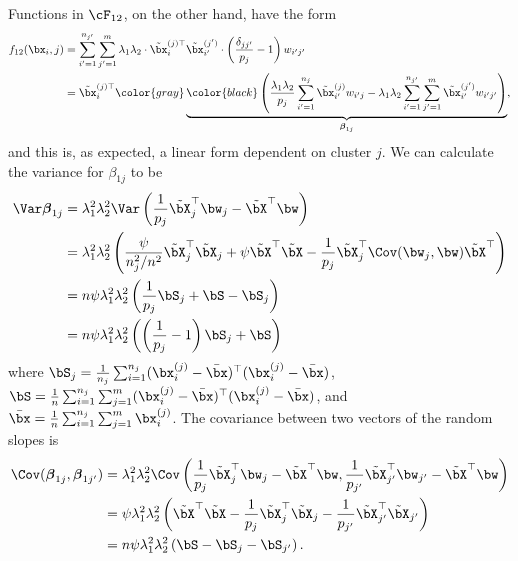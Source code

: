 Functions in $\cF_{12}$, on the other hand, have the form
\begin{align*}
  f_{12}(\bx_i, j)
  &= \sum_{i'=1}^{n_{j'}}\sum_{j'=1}^m \lambda_1\lambda_2 \cdot \tilde \bx_i^{(j)\top} \tilde \bx_{i'}^{(j')} \cdot \left( \frac{\delta_{jj'}}{p_j} - 1 \right)  w_{i'j'} \\
  &=  \tilde \bx_i^{(j)\top}   
  {\color{gray}
  \underbrace{\color{black}
  \left( \frac{\lambda_1\lambda_2}{p_j} \sum_{i'=1}^{n_{j}}  \tilde \bx_{i'}^{(j)} w_{i'j} - \lambda_1\lambda_2\sum_{i'=1}^{n_{j'}}\sum_{j'=1}^m  \tilde \bx_{i'}^{(j')}  w_{i'j'} \right)
  }_{\boldsymbol\beta_{1j}}},
\end{align*}
and this is, as expected, a linear form dependent on cluster $j$.
We can calculate the variance for $\beta_{1j}$ to be
\begin{align*}
  \Var \boldsymbol{\beta}_{1j}
  &= \lambda_1^2\lambda_2^2 \Var\left( \frac{1}{p_j} \tilde\bX_j^\top \bw_j - \tilde\bX^\top \bw \right) \\
  &= \lambda_1^2\lambda_2^2 \left( \frac{\psi}{n_j^2/n^2} \tilde\bX_j^\top\tilde\bX_j + \psi \tilde\bX^\top  \tilde\bX - \frac{1}{p_j} \tilde\bX_j^\top \Cov( \bw_j,\bw) \tilde\bX^\top  \right) \\
  &= n\psi\lambda_1^2\lambda_2^2 \left( \frac{1}{p_j}\bS_j +  \bS - \bS_{j} \right) \\
  &= n\psi\lambda_1^2\lambda_2^2 \left( \left(\frac{1}{p_j}-1\right)\bS_j +  \bS  \right)
\end{align*}
where $\bS_j = \frac{1}{n_j} \sum_{i=1}^{n_j} (\bx_i^{(j)} - \bar \bx)^\top(\bx_i^{(j)} - \bar \bx)$, $\bS = \frac{1}{n} \sum_{i=1}^{n_j} \sum_{j=1}^{m} (\bx_i^{(j)} -  \bar \bx)^\top(\bx_i^{(j)} - \bar \bx)$, and $\bar \bx = \frac{1}{n} \sum_{i=1}^{n_j} \sum_{j=1}^{m} \bx_i^{(j)}$.
The covariance between two vectors of the random slopes is
\begin{align*}
  \Cov(\boldsymbol{\beta}_{1j},\boldsymbol{\beta}_{1j'}) 
  &= \lambda_1^2\lambda_2^2  \Cov \left( \frac{1}{p_j} \tilde\bX_j^\top \bw_j - \tilde\bX^\top \bw, \frac{1}{p_{j'}} \tilde\bX_{j'}^\top \bw_{j'} - \tilde\bX^\top \bw  \right) \\
  &= \psi\lambda_1^2\lambda_2^2 \left( \tilde\bX^\top\tilde\bX - \frac{1}{p_j}\tilde\bX_j^\top\tilde\bX_j  - \frac{1}{p_{j'}}\tilde\bX_{j'}^\top\tilde\bX_{j'} \right) \\
  &= n\psi\lambda_1^2\lambda_2^2 \left( \bS - \bS_j - \bS_{j'}  \right).
\end{align*}

